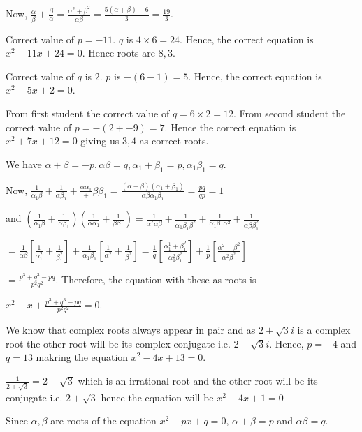   Now, $\frac{\alpha}{\beta} + \frac{\beta}{\alpha} = \frac{\alpha^2 + \beta^2}{\alpha\beta} =
  \frac{5(\alpha + \beta) - 6}{3} = \frac{19}{3}$.
\item Correct value of $p = -11$. $q$ is $4\times 6 = 24$. Hence, the correct equation is $x^2 - 11x + 24 =
  0$. Hence roots are $8, 3$.
\item Correct value of $q$ is $2$. $p$ is $-(6 - 1) = 5$. Hence, the correct equation is $x^2 - 5x + 2 = 0$.
\item From first student the correct value of $q = 6\times2 = 12$. From second student the correct value of
  $p = -(2 + -9) = 7$. Hence the correct equation is $x^2 + 7x + 12 = 0$ giving us $3, 4$ as correct roots.
\item We have $\alpha + \beta = -p, \alpha\beta = q, \alpha_1 + \beta_1 = p, \alpha_1\beta_1 = q$.

  Now, $\frac{1}{\alpha_1\beta} + \frac{1}{\alpha\beta_1} + \frac{\alpha\alpha_1}+ {\beta\beta_1} =
  \frac{(\alpha + \beta)(\alpha_1 + \beta_1)}{\alpha\beta\alpha_1\beta_1} = \frac{pq}{qp} = 1$

  and $\left(\frac{1}{\alpha_1\beta} + \frac{1}{\alpha\beta_1}\right)\left(\frac{1}{\alpha\alpha_1} +
  \frac{1}{\beta\beta_1}\right) = \frac{1}{\alpha_1^2\alpha\beta} + \frac{1}{\alpha_1\beta_1\beta^2} +
  \frac{1}{\alpha_1\beta_1\alpha^2} + \frac{1}{\alpha\beta\beta_1^2}$

  $= \frac{1}{\alpha\beta}\left[\frac{1}{\alpha_1^2} + \frac{1}{\beta_1^2}\right] +
  \frac{1}{\alpha_1\beta_1}\left[\frac{1}{\alpha^2} + \frac{1}{\beta^2}\right] =
  \frac{1}{q}\left[\frac{\alpha_1^1 + \beta_1^2}{\alpha_1^2\beta_1^2}\right] +
  \frac{1}{p}\left[\frac{\alpha^2 + \beta^2}{\alpha^2\beta^2}\right]$

  $= \frac{p^3 + q^3 - pq}{p^2q^2}$. Therefore, the equation with these as roots is

  $x^2 - x + \frac{p^3 + q^3 - pq}{p^2q^2} = 0$.
\item We know that complex roots always appear in pair and as $2 + \sqrt{3}i$ is a complex root the other
  root will be its complex conjugate i.e. $2 - \sqrt{3}i$. Hence, $p = -4$ and $q = 13$ makring the equation
  $x^2 - 4x + 13 = 0$.
\item $\frac{1}{2 + \sqrt{3}} = 2 - \sqrt{3}$ which is an irrational root and the other root will be its
  conjugate i.e. $2 + \sqrt{3}$ hence the equation will be $x^2 - 4x + 1 = 0$
\item Since $\alpha, \beta$ are roots of the equation $x^2 - px + q = 0$, $\alpha + \beta = p$ and
  $\alpha\beta = q$.

